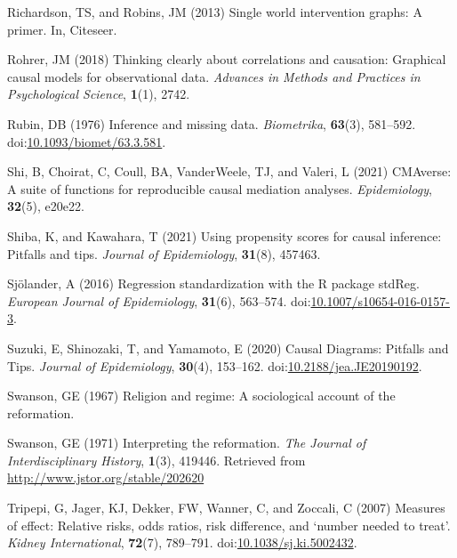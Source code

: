 \documentclass[
  singlecolumn,
  9pt]{article}
\begin{document}
\begin{CSLReferences}
Richardson, TS, and Robins, JM (2013) Single world intervention graphs:
A primer. In, Citeseer.

Rohrer, JM (2018) Thinking clearly about correlations and causation:
Graphical causal models for observational data. \emph{Advances in
Methods and Practices in Psychological Science}, \textbf{1}(1), 2742.

Rubin, DB (1976) Inference and missing data. \emph{Biometrika},
\textbf{63}(3), 581--592.
doi:\href{https://doi.org/10.1093/biomet/63.3.581}{10.1093/biomet/63.3.581}.

Shi, B, Choirat, C, Coull, BA, VanderWeele, TJ, and Valeri, L (2021)
CMAverse: A suite of functions for reproducible causal mediation
analyses. \emph{Epidemiology}, \textbf{32}(5), e20e22.

Shiba, K, and Kawahara, T (2021) Using propensity scores for causal
inference: Pitfalls and tips. \emph{Journal of Epidemiology},
\textbf{31}(8), 457463.

Sjölander, A (2016) Regression standardization with the R package
stdReg. \emph{European Journal of Epidemiology}, \textbf{31}(6),
563--574.
doi:\href{https://doi.org/10.1007/s10654-016-0157-3}{10.1007/s10654-016-0157-3}.

Suzuki, E, Shinozaki, T, and Yamamoto, E (2020) Causal Diagrams:
Pitfalls and Tips. \emph{Journal of Epidemiology}, \textbf{30}(4),
153--162.
doi:\href{https://doi.org/10.2188/jea.JE20190192}{10.2188/jea.JE20190192}.

Swanson, GE (1967) Religion and regime: A sociological account of the
reformation.

Swanson, GE (1971) Interpreting the reformation. \emph{The Journal of
Interdisciplinary History}, \textbf{1}(3), 419446. Retrieved from
\url{http://www.jstor.org/stable/202620}

Tripepi, G, Jager, KJ, Dekker, FW, Wanner, C, and Zoccali, C (2007)
Measures of effect: Relative risks, odds ratios, risk difference, and
{`}number needed to treat{'}. \emph{Kidney International},
\textbf{72}(7), 789--791.
doi:\href{https://doi.org/10.1038/sj.ki.5002432}{10.1038/sj.ki.5002432}.


\end{CSLReferences}
\end{document}
